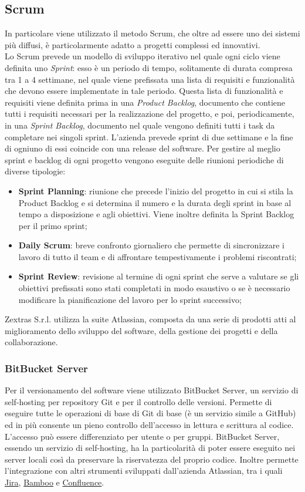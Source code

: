 \subsection{Scrum}
In particolare  viene utilizzato il metodo Scrum, che oltre ad essere uno dei sistemi più diffusi, è particolarmente adatto a progetti complessi ed innovativi.\\
Lo Scrum prevede un modello di sviluppo iterativo nel quale ogni ciclo viene definita uno \emph{Sprint}: esso è un periodo di tempo, solitamente di durata compresa tra 1 a 4 settimane, nel quale viene prefissata una lista di requisiti e funzionalità che devono essere implementate in tale periodo.
Questa lista di funzionalità e requisiti viene definita prima in una \emph{Product Backlog}, documento che contiene tutti i requisiti necessari per la realizzazione del progetto, e poi, periodicamente, in una \emph{Sprint Backlog}, documento nel quale vengono definiti tutti i task da completare nei singoli sprint.
L'azienda prevede sprint di due settimane e la fine di ogniuno di essi coincide con una release del software.
Per gestire al meglio sprint e backlog di ogni progetto vengono eseguite delle riunioni periodiche di diverse tipologie:
\begin{itemize}
	\item \textbf{Sprint Planning}: riunione che precede l'inizio del progetto in cui si stila la Product Backlog e si determina il numero e la durata degli sprint in base al tempo a disposizione e agli obiettivi. Viene inoltre definita la Sprint Backlog per il primo sprint;
	\item \textbf{Daily Scrum}: breve confronto giornaliero che permette di sincronizzare i lavoro di tutto il team e di affrontare tempestivamente i problemi riscontrati;
	\item \textbf{Sprint Review}: revisione al termine di ogni sprint che serve a valutare se gli obiettivi prefissati sono stati completati in modo esaustivo o se è necessario modificare la pianificazione del lavoro per lo sprint successivo;
\end{itemize}

Zextras S.r.l. utilizza la suite Atlassian, composta da una serie di prodotti atti al miglioramento dello sviluppo del software, della gestione dei progetti e della collaborazione. 
\subsubsection{BitBucket Server}
Per il versionamento del software viene utilizzato BitBucket Server, un servizio di self-hosting per repository Git e per il controllo delle versioni. Permette di eseguire tutte le operazioni di base di Git di base (è un servizio simile a GitHub) ed in più consente un pieno controllo dell'accesso in lettura e scrittura al codice. L'accesso può essere differenziato per utente o per gruppi. BitBucket Server, essendo un servizio di self-hosting, ha la particolarità di poter essere eseguito nei server locali così da preservare la riservatezza del proprio codice. Inoltre permette l'integrazione con altri strumenti sviluppati dall'azienda Atlassian, tra i quali \hyperref[subsubsec:jira]{Jira}, \hyperref[subsubsec:bamboo]{Bamboo} e \hyperref[subsubsec:confluence]{Confluence}.

